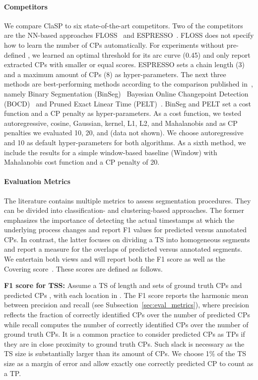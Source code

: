 \documentclass[pdflatex,sn-basic]{sn-jnl}
\begin{document}
\paragraph{Competitors}
We compare ClaSP to six state-of-the-art competitors. Two of the competitors are the NN-based approaches FLOSS~\citep{gharghabi2017matrix} and ESPRESSO~\citep{Deldari2020ESPRESSOEA}. FLOSS does not specify how to learn the number of CPs automatically. For experiments without pre-defined , we learned an optimal threshold for its arc curve (0.45) and only report extracted CPs with smaller or equal scores. ESPRESSO sets a chain length (3) and a maximum amount of CPs (8) as hyper-parameters. The next three methods are best-performing methods according to the comparison published in~\citep{van2020evaluation}, namely Binary Segmentation (BinSeg)~\citep{scott1974cluster} Bayesian Online Changepoint Detection (BOCD)~\citep{adams2007bayesian} and Pruned Exact Linear Time (PELT)~\citep{Killick2012OptimalDO}. BinSeg and PELT set a cost function and a CP penalty as hyper-parameters. As a cost function, we tested autoregressive, cosine, Gaussian, kernel, L1, L2, and Mahalanobis and as CP penalties we evaluated 10, 20, and  (data not shown). We choose autoregressive and 10 as default hyper-parameters for both algorithms. As a sixth method, we include the results for a simple window-based baseline (Window) \citep{truong2020selective} with Mahalanobis cost function and a CP penalty of 20.

\paragraph{Evaluation Metrics}
The literature contains multiple metrics to assess segmentation procedures. They can be divided into classification- and clustering-based approaches. The former emphasizes the importance of detecting the actual timestamps at which the underlying process changes and report F1 values for predicted versus annotated CPs. In contrast, the latter focuses on dividing a TS into homogeneous segments and report a measure for the overlaps of predicted versus annotated segments. We entertain both views and will report both the F1 score as well as the Covering score~\citep{van2020evaluation}. These scores are defined as follows. 

\textbf{F1 score for TSS:} Assume a TS  of length  and sets of ground truth CPs  and predicted CPs , with each location in . The F1 score reports the harmonic mean between precision and recall (see Subsection~\ref{sec:eval_metrics}), where precision reflects the fraction of correctly identified CPs over the number of predicted CPs while recall computes the number of correctly identified CPs over the number of ground truth CPs. It is a common practice to consider predicted CPs as TPs if they are in close proximity to ground truth CPs. Such slack is necessary as the TS size is substantially larger than its amount of CPs. We choose 1\% of the TS size as a margin of error and allow exactly one correctly predicted CP to count as a TP.
\end{document}
